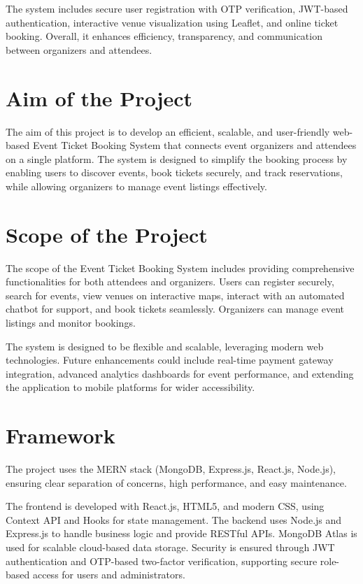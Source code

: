 \documentclass[12pt]{report}
\begin{document}
The system includes secure user registration with OTP verification, JWT-based authentication, interactive venue visualization using Leaflet, and online ticket booking. Overall, it enhances efficiency, transparency, and communication between organizers and attendees.

\linespread{1.5} 
\section{Aim of the Project} 
The aim of this project is to develop an efficient, scalable, and user-friendly web-based Event Ticket Booking System that connects event organizers and attendees on a single platform. The system is designed to simplify the booking process by enabling users to discover events, book tickets securely, and track reservations, while allowing organizers to manage event listings effectively.
\section{Scope of the Project} 
The scope of the Event Ticket Booking System includes providing comprehensive functionalities for both attendees and organizers. Users can register securely, search for events, view venues on interactive maps, interact with an automated chatbot for support, and book tickets seamlessly. Organizers can manage event listings and monitor bookings.

The system is designed to be flexible and scalable, leveraging modern web technologies. Future enhancements could include real-time payment gateway integration, advanced analytics dashboards for event performance, and extending the application to mobile platforms for wider accessibility.

\section{Framework} 
The project uses the MERN stack (MongoDB, Express.js, React.js, Node.js), ensuring clear separation of concerns, high performance, and easy maintenance.

The frontend is developed with React.js, HTML5, and modern CSS, using Context API and Hooks for state management. The backend uses Node.js and Express.js to handle business logic and provide RESTful APIs. MongoDB Atlas is used for scalable cloud-based data storage. Security is ensured through JWT authentication and OTP-based two-factor verification, supporting secure role-based access for users and administrators.
\end{document}
